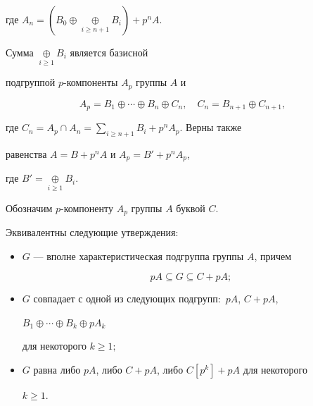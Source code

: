 где $A_n=(B_0\oplus\mathop{\oplus}\limits_{i\ge n+1}B_i)+p^n A$. 


Сумма $\mathop{\oplus}\limits_{i\ge1}B_i$ является базисной 


подгруппой $p$-компоненты $A_p$ группы $A$ и 


\begin{equation} 


A_p=B_1\oplus\dotsb\oplus B_n\oplus C_n,\quad 


C_n=B_{n+1}\oplus C_{n+1}, 


\end{equation} 


где $C_n=A_p\cap A_n=\sum\limits_{i\ge n+1}B_i+p^n A_p$. Верны также 


равенства $A=B+p^n A$ и $A_p=B'+p^n A_p$, 


где $B'=\mathop{\oplus}\limits_{i\ge1}B_i$. 


 


Обозначим $p$-компоненту $A_p$ группы $A$ буквой $C$. 


 


\begin{thms} 


Эквивалентны следующие утверждения$:$ 


\begin{itemize} 


\item[1)] $G$ --- вполне характеристическая подгруппа группы $A$, причем 


$$ 


pA\subseteq G\subseteq C+pA; 


$$ 


\item[2)] $G$ совпадает с одной из следующих подгрупп$:$ $pA$, $C+pA$, 


$B_1\oplus\dotsb\oplus B_k\oplus pA_k$ 


для некоторого $k\ge1;$ 


\item[3)] $G$ равна либо $pA$, либо $C+pA$, либо $C[p^k]+pA$ для некоторого 


$k\ge1$. 


\end{itemize} 


\end{thms} 


 


